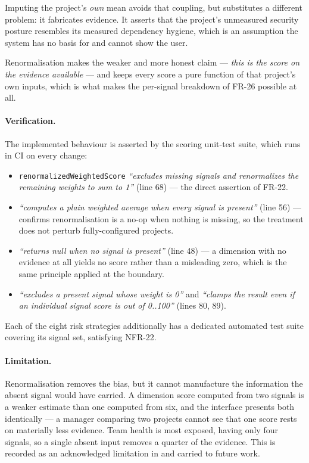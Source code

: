 Imputing the project's \emph{own} mean avoids that coupling, but substitutes a
different problem: it fabricates evidence. It asserts that the project's
unmeasured security posture resembles its measured dependency hygiene, which is
an assumption the system has no basis for and cannot show the user.

Renormalisation makes the weaker and more honest claim --- \emph{this is the
score on the evidence available} --- and keeps every score a pure function of
that project's own inputs, which is what makes the per-signal breakdown of FR-26
possible at all.

\paragraph{Verification.} The implemented behaviour is asserted by the scoring
unit-test suite, which runs in CI on every change:

\begin{itemize}
  \item \texttt{renormalizedWeightedScore} \emph{``excludes missing signals and
  renormalizes the remaining weights to sum to 1''} (line 68) --- the direct
  assertion of FR-22.
  \item \emph{``computes a plain weighted average when every signal is
  present''} (line 56) --- confirms renormalisation is a no-op when nothing is
  missing, so the treatment does not perturb fully-configured projects.
  \item \emph{``returns null when no signal is present''} (line 48) --- a
  dimension with no evidence at all yields no score rather than a misleading
  zero, which is the same principle applied at the boundary.
  \item \emph{``excludes a present signal whose weight is 0''} and \emph{``clamps
  the result even if an individual signal score is out of 0..100''} (lines 80,
  89).
\end{itemize}

Each of the eight risk strategies additionally has a dedicated automated test
suite covering its signal set, satisfying NFR-22.

\paragraph{Limitation.} Renormalisation removes the bias, but it cannot
manufacture the information the absent signal would have carried. A dimension
score computed from two signals is a weaker estimate than one computed from six,
and the interface presents both identically --- a manager comparing two projects
cannot see that one score rests on materially less evidence. Team health is most
exposed, having only four signals, so a single absent input removes a quarter of
the evidence. This is recorded as an acknowledged limitation in
 and carried to future work.


